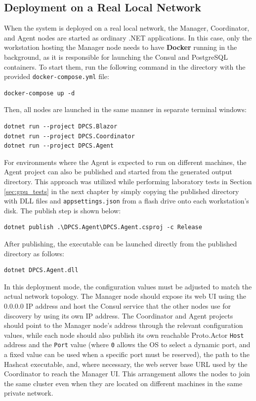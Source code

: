 \newpage

\subsection{Deployment on a Real Local Network}

When the system is deployed on a real local network, the Manager, Coordinator, and Agent nodes are started as ordinary .NET applications. In this case, only the workstation hosting the Manager node needs to have \textbf{Docker} running in the background, as it is responsible for launching the Consul and PostgreSQL containers. To start them, run the following command in the directory with the provided \verb|docker-compose.yml| file:

\begin{verbatim}
docker-compose up -d
\end{verbatim}

Then, all nodes are launched in the same manner in separate terminal windows:

\begin{verbatim}
dotnet run --project DPCS.Blazor
dotnet run --project DPCS.Coordinator
dotnet run --project DPCS.Agent
\end{verbatim}

For environments where the Agent is expected to run on different machines, the Agent project can also be published and started from the generated output directory. This approach was utilized while performing laboratory tests in Section \ref{sec:gpu_tests} in the next chapter by simply copying the published directory with DLL files and \verb|appsettings.json| from a flash drive onto each workstation's disk. The publish step is shown below:

\begin{verbatim}
dotnet publish .\DPCS.Agent\DPCS.Agent.csproj -c Release
\end{verbatim}

After publishing, the executable can be launched directly from the published directory as follows:

\begin{verbatim}
dotnet DPCS.Agent.dll
\end{verbatim}

In this deployment mode, the configuration values must be adjusted to match the actual network topology. The Manager node should expose its web UI using the 0.0.0.0 IP address and host the Consul service that the other nodes use for discovery by using its own IP address. The Coordinator and Agent projects should point to the Manager node's address through the relevant configuration values, while each node should also publish its own reachable Proto.Actor \verb|Host| address and the \verb|Port| value (where \verb|0| allows the OS to select a dynamic port, and a fixed value can be used when a specific port must be reserved), the path to the Hashcat executable, and, where necessary, the web server base URL used by the Coordinator to reach the Manager UI. This arrangement allows the nodes to join the same cluster even when they are located on different machines in the same private network.



